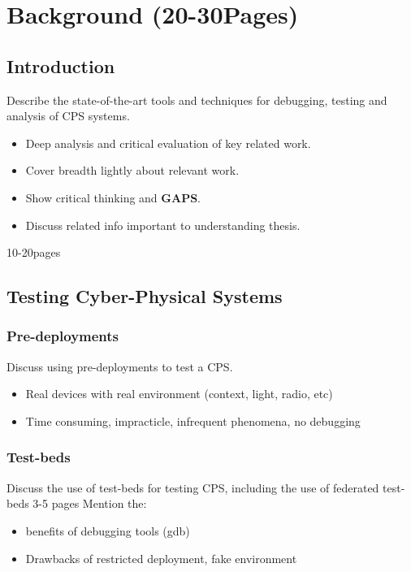 \chapter{Background (20-30Pages)}
\section{Introduction}
\label{sec:Introduction}
Describe the state-of-the-art tools and techniques for debugging, testing and analysis of CPS systems.
\begin{itemize}
  \item Deep analysis and critical evaluation of key related work.
  \item Cover breadth lightly about relevant work.
  \item Show critical thinking and \textbf{GAPS}.
  \item Discuss related info important to understanding thesis.
\end{itemize}
10-20pages

\section{Testing Cyber-Physical Systems}
\label{sec:Testing Cyber-Physical Systems}

\subsection{Pre-deployments}
\label{sub:Pre-deployments}
Discuss using pre-deployments to test a CPS.
\begin{itemize}
  \item Real devices with real environment (context, light, radio, etc)
  \item Time consuming, impracticle, infrequent phenomena, no debugging
\end{itemize}

\subsection{Test-beds}
Discuss the use of test-beds for testing CPS, including the use of federated test-beds
3-5 pages
Mention the:
\begin{itemize}
  \item benefits of debugging tools (gdb)
  \item Drawbacks of restricted deployment, fake environment
\end{itemize}

